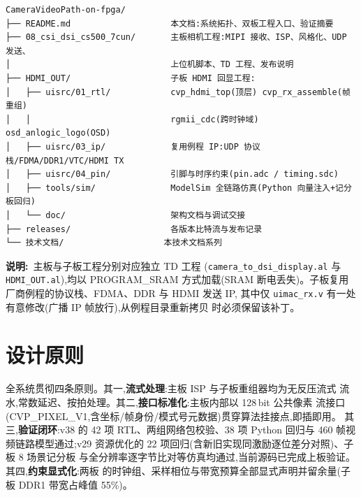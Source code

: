 \begingroup\scriptsize
\begin{verbatim}
CameraVideoPath-on-fpga/
├── README.md                    本文档:系统拓扑、双板工程入口、验证摘要
├── 08_csi_dsi_cs500_7cun/       主板相机工程:MIPI 接收、ISP、风格化、UDP 发送、
│                                上位机脚本、TD 工程、发布说明
├── HDMI_OUT/                    子板 HDMI 回显工程:
│   ├── uisrc/01_rtl/            cvp_hdmi_top(顶层) cvp_rx_assemble(帧重组)
│   │                            rgmii_cdc(跨时钟域) osd_anlogic_logo(OSD)
│   ├── uisrc/03_ip/             复用例程 IP:UDP 协议栈/FDMA/DDR1/VTC/HDMI TX
│   ├── uisrc/04_pin/            引脚与时序约束(pin.adc / timing.sdc)
│   ├── tools/sim/               ModelSim 全链路仿真(Python 向量注入+记分板回归)
│   └── doc/                     架构文档与调试交接
├── releases/                    各版本比特流与发布记录
└── 技术文档/                    本技术文档系列
\end{verbatim}
\endgroup

{\small\sloppy\textbf{说明:}\ 主板与子板工程分别对应独立 TD 工程
(\texttt{camera\_to\_dsi\_display.al} 与 \texttt{HDMI\_OUT.al}),均以 PROGRAM\_SRAM
方式加载(SRAM 断电丢失)。子板复用厂商例程的协议栈、FDMA、DDR 与 HDMI 发送 IP,
其中仅 \texttt{uimac\_rx.v} 有一处有意修改(广播 IP 帧放行),从例程目录重新拷贝
时必须保留该补丁。}

\section{设计原则}

全系统贯彻四条原则。其一,\textbf{流式处理}:主板 ISP 与子板重组器均为无反压流式
流水,常数延迟、按拍处理。其二,\textbf{接口标准化}:主板内部以 128\,bit 公共像素
流接口(CVP\_PIXEL\_V1,含坐标/帧身份/模式号元数据)贯穿算法挂接点,即插即用。
其三,\textbf{验证闭环}:v38 的 42 项 RTL、两组网络包校验、38 项 Python
回归与 460 帧视频链路模型通过;v29 资源优化的 22 项回归(含新旧实现同激励逐位差分对照)、子板 8 场景记分板
与全分辨率逐字节比对等仿真均通过,当前源码已完成上板验证。其四,\textbf{约束显式化}:两板
的时钟组、采样相位与带宽预算全部显式声明并留余量(子板 DDR1 带宽占峰值 55\%)。
